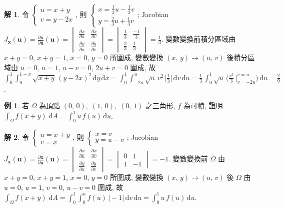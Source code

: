 \documentclass[12pt]{extarticle}
\newcommand{\ds}{\displaystyle}
\theoremstyle{definition}
\newtheorem*{ex}{例}
\newtheorem*{sol}{解}
\newcommand{\vu}{\mathbf{u}}
\newcommand{\vx}{\mathbf{x}}
\begin{document}
\begin{sol}
  令 $\ds\begin{cases}u = x + y \\ v = y - 2x\end{cases}\!\!\!\!\!$, 則 $\ds\begin{cases}x = \frac{1}{3}u - \frac{1}{3}v \\ y = \frac{2}{3}u + \frac{1}{3}v\end{cases}\!\!\!\!\!$; Jacobian $\ds J_{\vx}(\vu) = \frac{\partial\vx}{\partial\vu}(\vu) = \begin{vmatrix}\frac{\partial x}{\partial u} & \frac{\partial x}{\partial v} \\ \frac{\partial y}{\partial u}& \frac{\partial y}{\partial v}\end{vmatrix} = \begin{vmatrix}\frac{1}{3} & \frac{-1}{3} \\ \frac{2}{3} & \frac{1}{3}\end{vmatrix} = \frac{1}{3}$. 變數變換前積分區域由 $x + y = 0$, $x + y = 1$, $x = 0$, $y = 0$ 所圍成, 變數變換 $(x,\,y)\to(u,\,v)$ 後積分區域由 $u = 0$, $u = 1$, $u - v = 0$, $2u + v = 0$ 圍成, 故 $\ds\int_0^1\!\int_0^{1 - x}\!\sqrt{x + y}\,(y - 2x)^2\,\text{d}y\,\text{d}x = \int_0^1\!\int_{-2u}^{u}\sqrt{u}\,v^2\,\Big|\frac{1}{3}\Big|\,\text{d}v\,\text{d}u = \frac{1}{3}\,\int_0^1\!\sqrt{u}\,\bigg(\frac{v^3}{3}\,\bigg|_{v = -2u}^{v = u}\bigg)\,\text{d}u = \frac{2}{9}$.
\end{sol}

\begin{ex}
  若 $\Omega$ 為頂點 $(0,\,0),\;(1,\,0),\;(0,\,1)$ 之三角形, $f$ 為可積, 證明 $\ds\int_\Omega\!f(x + y)\;\text{d}A = \int_0^1\!u\,f(u)\,\text{d}u$. 
\end{ex}

\begin{sol}
  令 $\ds\begin{cases}u = x + y \\ v = x\end{cases}\!\!\!\!\!$, 則 $\ds\begin{cases}x = v \\ y = u - v\end{cases}\!\!\!\!\!$; Jacobian $\ds J_{\vx}(\vu) = \frac{\partial\vx}{\partial\vu}(\vu) = \begin{vmatrix}\frac{\partial x}{\partial u} & \frac{\partial x}{\partial v} \\ \frac{\partial y}{\partial u}& \frac{\partial y}{\partial v}\end{vmatrix} = \begin{vmatrix}0 & 1 \\ 1 & -1\end{vmatrix} = -1$. 變數變換前 $\Omega$ 由 $x + y = 0$, $x + y = 1$, $x = 0$, $y = 0$ 所圍成, 變數變換 $(x,\,y)\to(u,\,v)$ 後 $\Omega$ 由 $u = 0$, $u = 1$, $v = 0$, $u - v = 0$ 圍成, 故 $\ds\int_\Omega\!f(x + y)\;\text{d}A = \int_0^1\!\int_{0}^{u}\!f(u)\,\big|-1\big|\,\text{d}v\,\text{d}u = \int_0^1\!u\,f(u)\,\text{d}u$.
\end{sol}
\end{document}
